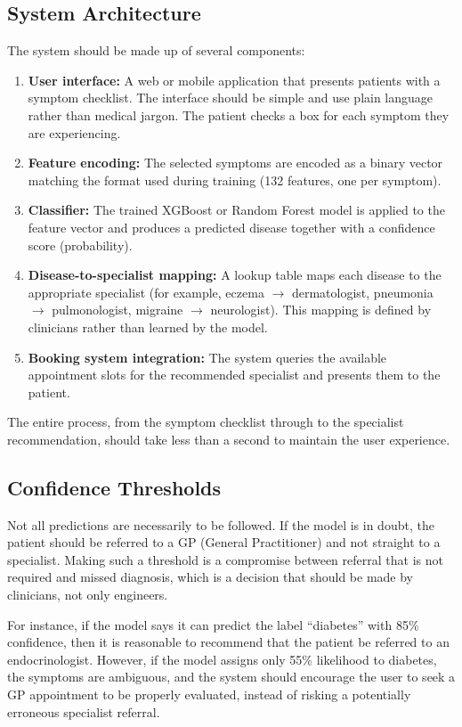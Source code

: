 \subsection{System Architecture}

The system should be made up of several components:

\begin{enumerate}
    \item \textbf{User interface:} A web or mobile application that presents patients with a symptom checklist. The interface should be simple and use plain language rather than medical jargon. The patient checks a box for each symptom they are experiencing.
    \item \textbf{Feature encoding:} The selected symptoms are encoded as a binary vector matching the format used during training (132 features, one per symptom).
    \item \textbf{Classifier:} The trained XGBoost or Random Forest model is applied to the feature vector and produces a predicted disease together with a confidence score (probability).
    \item \textbf{Disease-to-specialist mapping:} A lookup table maps each disease to the appropriate specialist (for example, eczema $\rightarrow$ dermatologist, pneumonia $\rightarrow$ pulmonologist, migraine $\rightarrow$ neurologist). This mapping is defined by clinicians rather than learned by the model.
    \item \textbf{Booking system integration:} The system queries the available appointment slots for the recommended specialist and presents them to the patient.
\end{enumerate}

The entire process, from the symptom checklist through to the specialist recommendation, should take less than a second to maintain the user experience.

\subsection{Confidence Thresholds}

Not all predictions are necessarily to be followed. If the model is in doubt, the patient should be referred to a GP (General Practitioner) and not straight to a specialist. Making such a threshold is a compromise between referral that is not required and missed diagnosis, which is a decision that should be made by clinicians, not only engineers.

For instance, if the model says it can predict the label ``diabetes'' with 85\% confidence, then it is reasonable to recommend that the patient be referred to an endocrinologist. However, if the model assigns only 55\% likelihood to diabetes, the symptoms are ambiguous, and the system should encourage the user to seek a GP appointment to be properly evaluated, instead of risking a potentially erroneous specialist referral.

